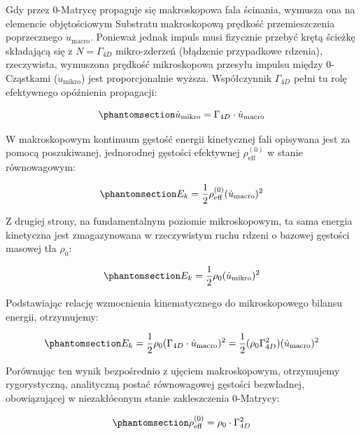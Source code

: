 \documentclass[
  polish,
  letterpaper,
  DIV=11,
  numbers=noendperiod,
  oneside]{scrartcl}
\begin{document}
Gdy przez 0-Matrycę propaguje się makroskopowa fala ścinania, wymusza
ona na elemencie objętościowym Substratu makroskopową prędkość
przemieszczenia poprzecznego \(\dot{u}_{\text{macro}}\). Ponieważ jednak
impuls musi fizycznie przebyć krętą ścieżkę składającą się z
\(N = \Gamma_{4D}\) mikro-zderzeń (błądzenie przypadkowe rdzenia),
rzeczywista, wymuszona prędkość mikroskopowa przesyłu impulsu między
0-Cząstkami (\(\dot{u}_{\text{mikro}}\)) jest proporcjonalnie wyższa.
Współczynnik \(\Gamma_{4D}\) pełni tu rolę efektywnego opóźnienia
propagacji:

\begin{equation}\protect\phantomsection\label{eq-1-3-3-wz5-a}{\dot{u}_{\text{mikro}} = \Gamma_{4D} \cdot \dot{u}_{\text{macro}}}\end{equation}

W makroskopowym kontinuum gęstość energii kinetycznej fali opisywana
jest za pomocą poszukiwanej, jednorodnej gęstości efektywnej
\(\rho_{\text{eff}}^{(0)}\) w stanie równowagowym:

\begin{equation}\protect\phantomsection\label{eq-1-3-3-wz5-b}{E_k = \frac{1}{2} \rho_{\text{eff}}^{(0)} (\dot{u}_{\text{macro}})^2}\end{equation}

Z drugiej strony, na fundamentalnym poziomie mikroskopowym, ta sama
energia kinetyczna jest zmagazynowana w rzeczywistym ruchu rdzeni o
bazowej gęstości masowej tła \(\rho_0\):

\begin{equation}\protect\phantomsection\label{eq-1-3-3-wz5-c}{E_k = \frac{1}{2} \rho_0 (\dot{u}_{\text{mikro}})^2}\end{equation}

Podstawiając relację wzmocnienia kinematycznego do mikroskopowego
bilansu energii, otrzymujemy:

\begin{equation}\protect\phantomsection\label{eq-1-3-3-wz5-d}{E_k = \frac{1}{2} \rho_0 (\Gamma_{4D} \cdot \dot{u}_{\text{macro}})^2 = \frac{1}{2} (\rho_0 \Gamma_{4D}^2) (\dot{u}_{\text{macro}})^2}\end{equation}

Porównując ten wynik bezpośrednio z ujęciem makroskopowym, otrzymujemy
rygorystyczną, analityczną postać równowagowej gęstości bezwładnej,
obowiązującej w niezakłóconym stanie zakleszczenia 0-Matrycy:

\begin{equation}\protect\phantomsection\label{eq-1-3-3-wz5}{\rho_{\text{eff}}^{(0)} = \rho_0 \cdot \Gamma_{4D}^2}\end{equation}
\end{document}
